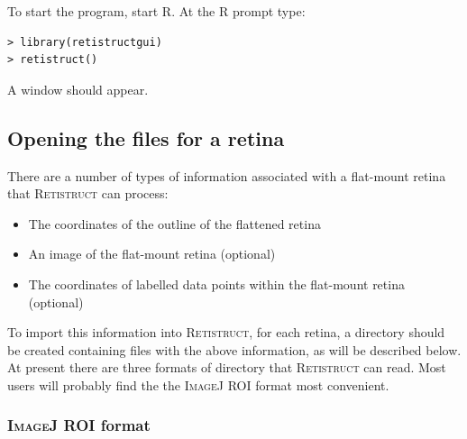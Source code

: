 \documentclass{article}
\begin{document}
To start the program, start \textsc{R}. At the \textsc{R} prompt type:

\begin{verbatim}
> library(retistructgui)
> retistruct()
\end{verbatim}
A window should appear.

\subsection{Opening the files for a retina}
\label{manual:sec:opening-files-retina}

There are a number of types of information associated with a
flat-mount retina that \textsc{Retistruct} can process:
\begin{itemize}
\item The coordinates of the outline of the flattened retina
\item An image of the flat-mount retina (optional)
\item The coordinates of labelled data points within the flat-mount
  retina (optional)
\end{itemize}
To import this information into \textsc{Retistruct}, for each retina,
a directory should be created containing files with the above
information, as will be described below.  At present there are three
formats of directory that \textsc{Retistruct} can read.  Most users
will probably find the the \textsc{ImageJ} ROI format most convenient.

\subsubsection{\textsc{ImageJ} ROI format}
\label{retistruct-manual:sec:ijroi-format}
\end{document}

